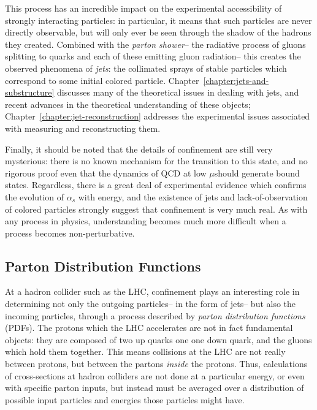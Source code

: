 This process has an incredible impact on the experimental accessibility of strongly interacting particles: in particular, it means that such particles are never directly observable, but will only ever be seen through the shadow of the hadrons they created. Combined with the \textit{parton shower}-- the radiative process of gluons splitting to quarks and each of these emitting gluon radiation-- this creates the observed phenomena of \textit{jets}: the collimated sprays of stable particles which correspond to some initial colored particle. Chapter~\ref{chapter:jets-and-substructure} discusses many of the theoretical issues in dealing with jets, and recent advances in the theoretical understanding of these objects; Chapter~\ref{chapter:jet-reconstruction} addresses the experimental issues associated with measuring and reconstructing them.


Finally, it should be noted that the details of confinement are still very mysterious: there is no known mechanism for the transition to this state, and no rigorous proof even that the dynamics of QCD at low $\mu$should generate bound states. Regardless, there is a great deal of experimental evidence which confirms the evolution of $\alpha_s$ with energy, and the existence of jets and lack-of-observation of colored particles strongly suggest that confinement is very much real. As with any process in physics, understanding becomes much more difficult when a process becomes non-perturbative.

\subsection{Parton Distribution Functions}

At a hadron collider such as the LHC, confinement plays an interesting role in determining not only the outgoing particles-- in the form of jets-- but also the incoming particles, through a process described by \textit{parton distribution functions} (PDFs). The protons which the LHC accelerates are not in fact fundamental objects: they are composed of two up quarks one one down quark, and the gluons which hold them together. This means collisions at the LHC are not really between protons, but between the partons \textit{inside} the protons. Thus, calculations of cross-sections at hadron colliders are not done at a particular energy, or even with specific parton inputs, but instead must be averaged over a distribution of possible input particles and energies those particles might have.

